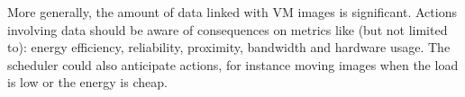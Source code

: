 More generally, the amount of data linked with VM images is significant.
Actions involving data  should be aware of consequences on metrics like
(but not limited to): energy efficiency, reliability, proximity, bandwidth and
hardware usage. The scheduler could also anticipate actions, for instance moving images when
the load is low or the energy is cheap.


